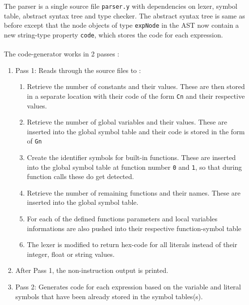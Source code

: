 \documentclass[12pt]{article}
\begin{document}
The parser is a single source file \texttt{parser.y} with dependencies on lexer, symbol table, abstract syntax tree and type checker.  The abstract syntax tree is same as before except that the node objects of type \texttt{expNode} in the AST now contain a new string-type property \texttt{code}, which stores the code for each expression.
 \\~
\\The code-generator works in 2 passes :
\begin{enumerate}
\item Pass 1: Reads through the source files to :
\begin{enumerate} 
\item Retrieve the number of constants and their values. These are then stored in a separate location with their code of the form \texttt{Cn} and their respective values.
\item Retrieve the number of global variables and their values. These are inserted into the global symbol table and their code is stored in the form of  \texttt{Gn}
\item Create the identifier symbols for built-in functions. These are inserted into the global symbol table at function number \texttt{0} and \texttt{1}, so that during function calls these do get detected.
\item Retrieve the number of remaining functions and their names. These are inserted into the global symbol table.
\item For each of the defined functions parameters and local variables informations are also pushed into their respective function-symbol table
\item The lexer is modified to return hex-code for all literals instead of their integer, float or string values.
\end{enumerate}
\item After Pass 1, the non-instruction output is printed.
\item Pass 2: Generates code for each expression based on the variable and literal symbols that have been already stored in the symbol tables(s). 
\end{enumerate}
\end{document}
